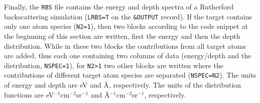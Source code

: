 Finally, the \texttt{RBS} file contains the energy and depth spectra of a
Rutherford backscattering simulation (\texttt{LRBS=T} on the \texttt{\&OUTPUT}
record). If the target contains only one atom species (\texttt{N2=1}), then two
blocks according to the code snippet at the beginning of this section are
written, first the energy and then the depth distribution. While in these two
blocks the contributions from all target atoms are added, thus each one
containing two columns of data (energy/depth and the distribution,
\texttt{NSPEC=1}), for \texttt{N2>1} two other blocks are written where the
contributions of different target atom species are separated
(\texttt{NSPEC=N2}). The units of energy and depth are eV and \AA, respectively.
The units of the distribution functions are eV$^{-1}$cm$^{-2}$sr$^{-1}$ and
\AA$^{-1}$cm$^{-2}$sr$^{-1}$, respectively.  
